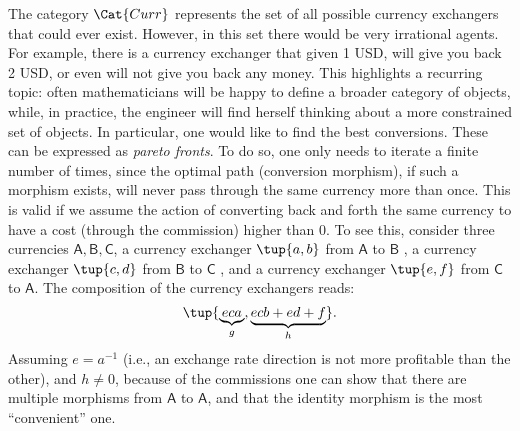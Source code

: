 

The category $\Cat{Curr}$ represents the set of all possible currency exchangers that could
ever exist. However, in this set there would be very irrational agents. For example, there is a currency exchanger that given 1 USD, will give you back 2 USD, or even will not give you back any money. This highlights a recurring topic: often mathematicians will be happy to define a broader category of objects, while, in practice, the engineer will find herself thinking about a more constrained set of objects. In particular, one would like to find the best conversions. These can be expressed as \emph{pareto fronts}. To do so, one only needs to iterate a finite number of times, since the optimal path (conversion morphism), if such a morphism exists, will never pass through the same currency more than once.  This is valid if we assume the action of converting back and forth the same currency to have a cost (through the commission) higher than 0. To see this, consider three currencies $\mathsf{A,B,C}$, a currency exchanger $\tup{a,b}$ from $\mathsf{A}$ to $\mathsf{B}$ , a currency exchanger $\tup{c,d}$ from $\mathsf{B}$ to $\mathsf{C}$ , and a currency exchanger $\tup{e,f}$ from $\mathsf{C}$ to $\mathsf{A}$.  The composition of the currency exchangers reads:
\begin{equation}
\tup{\underbrace{eca}_{g}, \underbrace{ecb+ed+f}_{h}}.
\end{equation}
Assuming $e=a^{-1}$ (i.e., an exchange rate direction is not more profitable than the other), and $h\neq 0$, because of the commissions one can show that there are multiple morphisms from $\mathsf{A}$ to $\mathsf{A}$, and that the identity morphism is the most ``convenient'' one.


